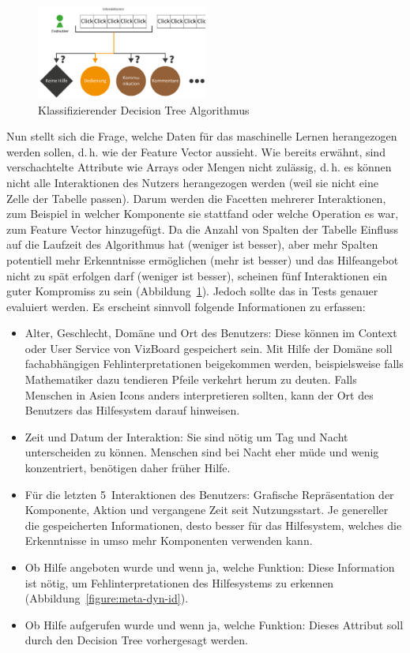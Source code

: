 \documentclass[
	headsepline,
	footsepline,
	fontsize=12pt,
	bibliography=totoc
]{scrbook}
\begin{document}
\begin{figure}[htbp]
   \centering
   \includegraphics[width=0.5\textwidth]{images/konzeption-sml-ziel.png}
   \caption{Klassifizierender Decision Tree Algorithmus}
   \label{figure:sml-ziel}
\end{figure}

Nun stellt sich die Frage, welche Daten für das maschinelle Lernen herangezogen werden sollen, d.\,h. wie der Feature Vector aussieht. Wie bereits erwähnt, sind verschachtelte Attribute wie Arrays oder Mengen nicht zulässig, d.\,h. es können nicht alle Interaktionen des Nutzers herangezogen werden (weil sie nicht eine Zelle der Tabelle passen). Darum werden die Facetten mehrerer Interaktionen, zum Beispiel in welcher Komponente sie stattfand oder welche Operation es war, zum Feature Vector hinzugefügt. Da die Anzahl von Spalten der Tabelle Einfluss auf die Laufzeit des Algorithmus hat (weniger ist besser), aber mehr Spalten potentiell mehr Erkenntnisse ermöglichen (mehr ist besser) und das Hilfeangebot nicht zu spät erfolgen darf (weniger ist besser), scheinen fünf Interaktionen ein guter Kompromiss zu sein (Abbildung~\ref{figure:sml-ziel}). Jedoch sollte das in Tests genauer evaluiert werden. Es erscheint sinnvoll folgende Informationen zu erfassen:

\begin{itemize}
	\item Alter, Geschlecht, Domäne und Ort des Benutzers: Diese können im Context oder User Service von VizBoard gespeichert sein. Mit Hilfe der Domäne soll fachabhängigen Fehlinterpretationen beigekommen werden, beispielsweise falls Mathematiker dazu tendieren Pfeile verkehrt herum zu deuten. Falls Menschen in Asien Icons anders interpretieren sollten, kann der Ort des Benutzers das Hilfesystem darauf hinweisen.
	\item Zeit und Datum der Interaktion: Sie sind nötig um Tag und Nacht unterscheiden zu können. Menschen sind bei Nacht eher müde und wenig konzentriert, benötigen daher früher Hilfe.
	\item Für die letzten 5~Interaktionen des Benutzers: Grafische Repräsentation der Komponente, Aktion und vergangene Zeit seit Nutzungsstart. Je genereller die gespeicherten Informationen, desto besser für das Hilfesystem, welches die Erkenntnisse in umso mehr Komponenten verwenden kann.
	\item Ob Hilfe angeboten wurde und wenn ja, welche Funktion: Diese Information ist nötig, um Fehlinterpretationen des Hilfesystems zu erkennen (Abbildung~\ref{figure:meta-dyn-id}).
	\item Ob Hilfe aufgerufen wurde und wenn ja, welche Funktion: Dieses Attribut soll durch den Decision Tree vorhergesagt werden.
\end{itemize}
\end{document}
